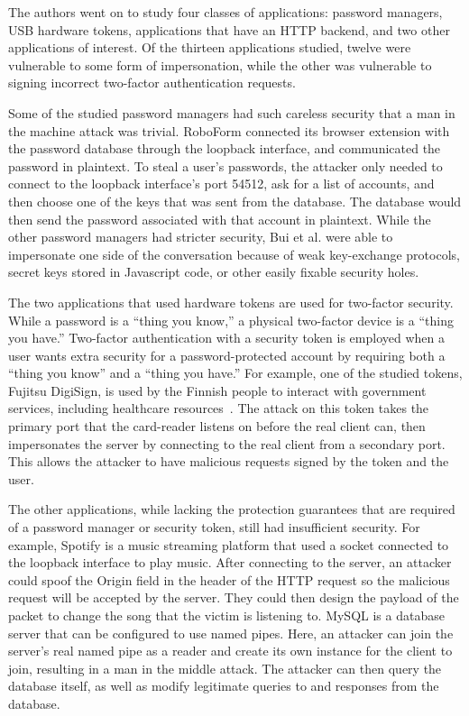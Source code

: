 The authors went on to study four classes of applications: password managers, USB hardware tokens, applications that have an HTTP backend, and two other applications of interest.  Of the thirteen applications studied, twelve were vulnerable to some form of impersonation, while the other was vulnerable to signing incorrect two-factor authentication requests.

Some of the studied password managers had such careless security that a man in the machine attack was trivial.  RoboForm connected its browser extension with the password database through the loopback interface, and communicated the password in plaintext.  To steal a user's passwords, the attacker only needed to connect to the loopback interface's port 54512, ask for a list of accounts, and then choose one of the keys that was sent from the database.  The database would then send the password associated with that account in plaintext.  While the other password managers had stricter security, Bui et al. were able to impersonate one side of the conversation because of weak key-exchange protocols, secret keys stored in Javascript code, or other easily fixable security holes.

The two applications that used hardware tokens are used for two-factor security.  While a password is a ``thing you know,'' a physical two-factor device is a ``thing you have.''  Two-factor authentication with a security token is employed when a user wants extra security for a password-protected account by requiring both a ``thing you know'' and a ``thing you have.''  For example, one of the studied tokens, Fujitsu DigiSign, is used by the Finnish people to interact with government services, including healthcare resources~\cite{MitMa}.  The attack on this token takes the primary port that the card-reader listens on before the real client can, then impersonates the server by connecting to the real client from a secondary port.  This allows the attacker to have malicious requests signed by the token and the user.

The other applications, while lacking the protection guarantees that are required of a password manager or security token, still had insufficient security.  For example, Spotify is a music streaming platform that used a socket connected to the loopback interface to play music.  After connecting to the server, an attacker could spoof the Origin field in the header of the HTTP request so the malicious request will be accepted by the server.  They could then design the payload of the packet to change the song that the victim is listening to.  MySQL is a database server that can be configured to use named pipes.  Here, an attacker can join the server's real named pipe as a reader and create its own instance for the client to join, resulting in a man in the middle attack.  The attacker can then query the database itself, as well as modify legitimate queries to and responses from the database.

